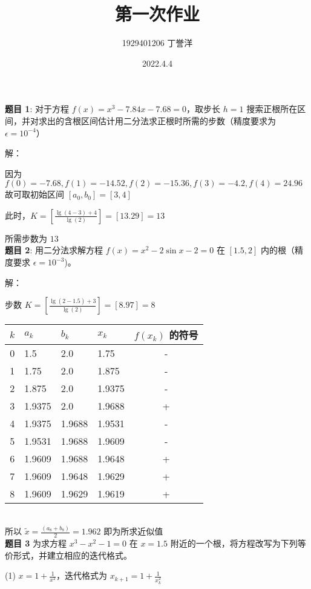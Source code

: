 \documentclass{article}
\title{第一次作业}
\author{1929401206 丁誉洋}
\date{2022.4.4}
\begin{document}
\maketitle


\noindent\textbf{题目 1}: 对于方程 $f(x) = x^3 - 7.84x - 7.68 = 0$，取步长 $h = 1$ 搜索正根所在区间，并对求出的含根区间估计用二分法求正根时所需的步数（精度要求为 $\epsilon=10^{-4}$）

\noindent 解：

因为 $f(0) = -7.68, f(1) = -14.52, f(2) = -15.36, f(3) = -4.2, f(4) = 24.96$
故可取初始区间 $[a_0, b_0] = [3, 4]$

此时，$K = [\frac{\lg(4 - 3) + 4}{\lg(2)}] = [13.29] = 13$

所需步数为 $13$ \\

\noindent\textbf{题目 2}: 用二分法求解方程 $f(x) = x^2 - 2\sin x - 2 = 0$ 在 $[1.5, 2]$ 内的根（精度要求 $\epsilon = 10^{-3}$)。

\noindent 解：

步数 $K = [\frac{\lg(2 - 1.5) + 3}{\lg(2)}] = [8.97] = 8$ \\

\begin{tabular}{|c|l|l|l|c|}
    \hline
    $k$ & $a_k$ & $b_k$ & $x_k$ & $f(x_k)$ 的符号 \\
    \hline
    0 & 1.5 & 2.0 & 1.75 & - \\
    1 & 1.75 & 2.0 & 1.875 & - \\
    2 & 1.875 & 2.0 & 1.9375 & - \\
    3 & 1.9375 & 2.0 & 1.9688 & + \\
    4 & 1.9375 & 1.9688 & 1.9531 & - \\
    5 & 1.9531 & 1.9688 & 1.9609 & - \\
    6 & 1.9609 & 1.9688 & 1.9648 & + \\
    7 & 1.9609 & 1.9648 & 1.9629 & + \\
    8 & 1.9609 & 1.9629 & 1.9619 & + \\
    \hline
\end{tabular} \\

所以 $\widetilde{x} = \frac{(a_{8} + b_{8})}{2} = 1.962$ 即为所求近似值 \\


\noindent\textbf{题目 3} 为求方程 $x^3 - x^2 - 1 = 0$ 在 $x=1.5$ 附近的一个根，将方程改写为下列等价形式，并建立相应的迭代格式。

(1) $x = 1 + \frac{1}{x^2}$，迭代格式为 $x_{k + 1} = 1 + \frac{1}{x_k^2}$
\end{document}
